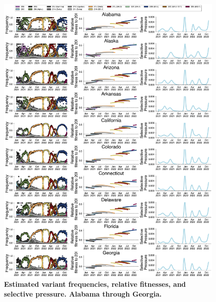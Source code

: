 \documentclass[11pt,oneside,letterpaper]{article}
\begin{document}
\begin{figure}[t!]
    \centering
    \includegraphics[width=1.0\textwidth=0.01]{./supplementary_figures/selective-pressure-analysis_group_1.png}
    \caption{
      \textbf{Estimated variant frequencies, relative fitnesses, and selective pressure. Alabama through Georgia.}
    }
    \label{fig:selective_pressure_group_1}
\end{figure}
\end{document}
